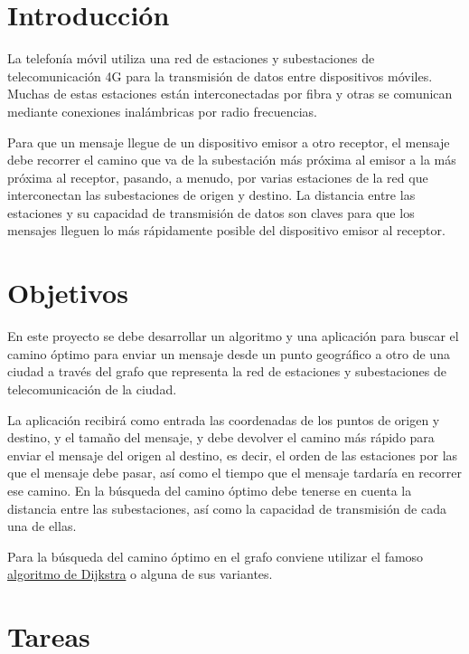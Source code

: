 \documentclass[
  a4paper,
]{scrreport}
\begin{document}
\hypertarget{introducciuxf3n}{%
\section{Introducción}\label{introducciuxf3n}}

La telefonía móvil utiliza una red de estaciones y subestaciones de
telecomunicación 4G para la transmisión de datos entre dispositivos
móviles. Muchas de estas estaciones están interconectadas por fibra y
otras se comunican mediante conexiones inalámbricas por radio
frecuencias.

Para que un mensaje llegue de un dispositivo emisor a otro receptor, el
mensaje debe recorrer el camino que va de la subestación más próxima al
emisor a la más próxima al receptor, pasando, a menudo, por varias
estaciones de la red que interconectan las subestaciones de origen y
destino. La distancia entre las estaciones y su capacidad de transmisión
de datos son claves para que los mensajes lleguen lo más rápidamente
posible del dispositivo emisor al receptor.

\hypertarget{objetivos}{%
\section{Objetivos}\label{objetivos}}

En este proyecto se debe desarrollar un algoritmo y una aplicación para
buscar el camino óptimo para enviar un mensaje desde un punto geográfico
a otro de una ciudad a través del grafo que representa la red de
estaciones y subestaciones de telecomunicación de la ciudad.

La aplicación recibirá como entrada las coordenadas de los puntos de
origen y destino, y el tamaño del mensaje, y debe devolver el camino más
rápido para enviar el mensaje del origen al destino, es decir, el orden
de las estaciones por las que el mensaje debe pasar, así como el tiempo
que el mensaje tardaría en recorrer ese camino. En la búsqueda del
camino óptimo debe tenerse en cuenta la distancia entre las
subestaciones, así como la capacidad de transmisión de cada una de
ellas.

Para la búsqueda del camino óptimo en el grafo conviene utilizar el
famoso
\href{https://es.wikipedia.org/wiki/Algoritmo_de_Dijkstra}{algoritmo de
Dijkstra} o alguna de sus variantes.

\hypertarget{tareas}{%
\section{Tareas}\label{tareas}}
\end{document}
